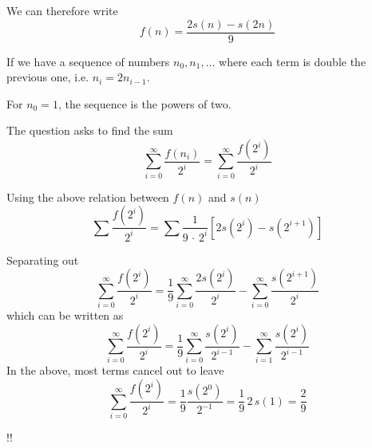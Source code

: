 \documentclass[11pt]{amsart}
\begin{document}
We can therefore write 
$$
f(n) = \frac{2 s(n) - s(2n)}{9}
$$


If we have a sequence of numbers $n_{0}, n_{1}, \ldots $ where each term is double the previous one, i.e. $n_{i} = 2 n_{i-1}$.

For $n_{0} = 1$, the sequence is the powers of two.

The question asks to find the sum
%
$$
\sum_{i=0}^{\infty} \frac{f(n_{i})}{2^{i}} = 
\sum_{i=0}^{\infty} \frac{f(2^{i})}{2^{i}} 
$$

Using the above relation between $f(n)$ and $s(n)$
$$
\sum \frac{f(2^{i})}{2^{i}} 
=
\sum \frac{1}{9 \, \cdot \, 2^{i}} \left[
2 s(2^{i}) - s(2^{i+1})
\right]
$$

Separating out
$$
\sum_{i=0}^{\infty} \frac{f(2^{i})}{2^{i}} =
%
\frac{1}{9}
\sum_{i=0}^{\infty} \frac{2 s(2^{i})}{2^{i}}
-
\sum_{i=0}^{\infty} \frac{ s(2^{i+1})}{2^{i}} 
$$
which can be written as
$$
\sum_{i=0}^{\infty} \frac{f(2^{i})}{2^{i}} =
%
\frac{1}{9}
\sum_{i=0}^{\infty} \frac{ s(2^{i})}{2^{i-1}}
-
\sum_{i=1}^{\infty} \frac{ s(2^{i})}{2^{i-1}} 
$$
In the above, most terms cancel out to leave
$$
\sum_{i=0}^{\infty} \frac{f(2^{i})}{2^{i}} =
%
\frac{1}{9}
\frac{ s(2^{0})}{2^{-1}}
=
\frac{1}{9}
\, 2 \, s(1)
=
\frac{2}{9}
$$

!!
\end{document}
